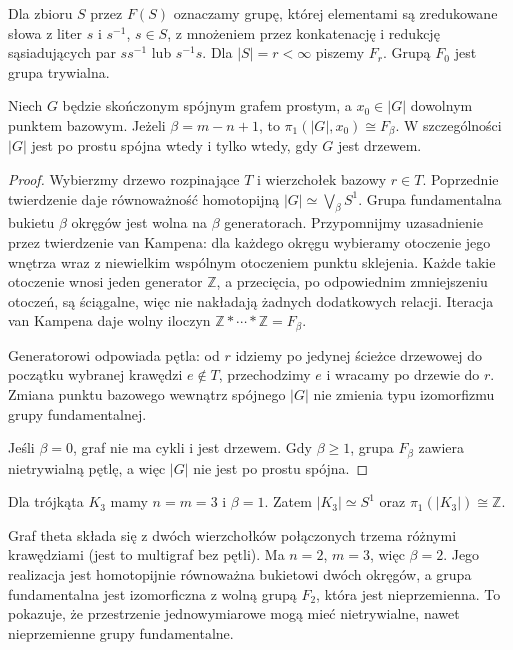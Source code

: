 \begin{definicja}
Dla zbioru $S$ przez $F(S)$ oznaczamy grupę, której elementami
są zredukowane słowa z liter $s$ i $s^{-1}$, $s\in S$,
z mnożeniem przez konkatenację i redukcję sąsiadujących par
$s s^{-1}$ lub $s^{-1}s$. Dla $|S|=r<\infty$ piszemy $F_r$.
Grupą $F_0$ jest grupa trywialna.
\end{definicja}

\begin{twierdzenie}
\label{thm:tg-free-pi1}
Niech $G$ będzie skończonym spójnym grafem prostym,
a $x_0\in|G|$ dowolnym punktem bazowym. Jeżeli
$\beta=m-n+1$, to $\pi_1(|G|,x_0)\cong F_\beta$.
W szczególności $|G|$ jest po prostu spójna wtedy i tylko
wtedy, gdy $G$ jest drzewem.
\end{twierdzenie}

\begin{proof}
Wybierzmy drzewo rozpinające $T$ i wierzchołek bazowy
$r\in T$. Poprzednie twierdzenie daje równoważność
homotopijną $|G|\simeq\bigvee_\beta S^1$.
Grupa fundamentalna bukietu $\beta$ okręgów jest wolna
na $\beta$ generatorach. Przypomnijmy uzasadnienie
przez twierdzenie van Kampena: dla każdego okręgu
wybieramy otoczenie jego wnętrza wraz z niewielkim wspólnym
otoczeniem punktu sklejenia. Każde takie otoczenie wnosi
jeden generator $\mathbb Z$, a przecięcia, po odpowiednim
zmniejszeniu otoczeń, są ściągalne, więc nie nakładają
żadnych dodatkowych relacji. Iteracja van Kampena
daje wolny iloczyn $\mathbb Z*\cdots*\mathbb Z=F_\beta$.

Generatorowi odpowiada pętla: od $r$ idziemy po jedynej
ścieżce drzewowej do początku wybranej krawędzi
$e\notin T$, przechodzimy $e$ i wracamy po drzewie do $r$.
Zmiana punktu bazowego wewnątrz spójnego $|G|$ nie zmienia
typu izomorfizmu grupy fundamentalnej.

Jeśli $\beta=0$, graf nie ma cykli i jest drzewem.
Gdy $\beta\ge1$, grupa $F_\beta$ zawiera nietrywialną
pętlę, a więc $|G|$ nie jest po prostu spójna.
\end{proof}

\begin{przyklad}
Dla trójkąta $K_3$ mamy $n=m=3$ i $\beta=1$.
Zatem $|K_3|\simeq S^1$ oraz
$\pi_1(|K_3|)\cong\mathbb Z$.

Graf theta składa się z dwóch wierzchołków połączonych
trzema różnymi krawędziami (jest to multigraf bez pętli).
Ma $n=2$, $m=3$, więc $\beta=2$.
Jego realizacja jest homotopijnie równoważna bukietowi
dwóch okręgów, a grupa fundamentalna jest izomorficzna
z wolną grupą $F_2$, która jest nieprzemienna.
To pokazuje, że przestrzenie jednowymiarowe mogą mieć
nietrywialne, nawet nieprzemienne grupy fundamentalne.
\end{przyklad}

